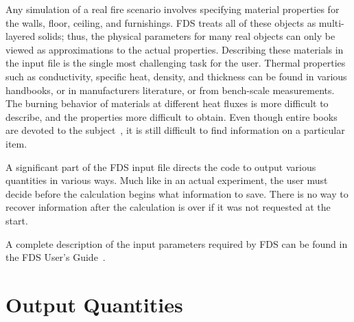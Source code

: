 \documentclass[11pt]{book}
\begin{document}
Any simulation of a real fire scenario involves specifying material properties for the walls, floor, ceiling, and furnishings. FDS treats all of these objects as multi-layered solids; thus, the physical parameters for many real objects can only be viewed as approximations to the actual properties. Describing these materials in the input file is the single most challenging task for the user. Thermal properties such as conductivity, specific heat, density, and thickness can be found in various handbooks, or in manufacturers literature, or from bench-scale measurements. The burning behavior of materials at different heat fluxes is more difficult to describe, and the properties more difficult to obtain. Even though entire books are devoted to the subject~\cite{Babrauskas:2}, it is still difficult to find information on a particular item.

A significant part of the FDS input file directs the code to output various quantities in various ways. Much like in an actual experiment, the user must decide before the calculation begins what information to save. There is no way to recover information after the calculation is over if it was not requested at the start.

A complete description of the input parameters required by FDS can be found in the FDS User's Guide~\cite{FDS_Users_Guide}.


\section{Output Quantities}
\end{document}
